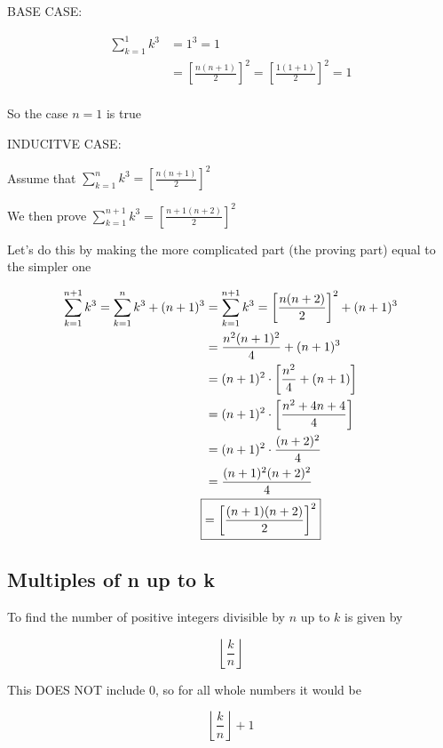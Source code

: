 \documentclass[../../Main.tex]{subfiles}
\begin{document}
\begin{poof}
    BASE CASE:

    \begin{align*}
        \sum_{k = 1}^{1}k^3 &= 1^3 = 1 \\
        &= \left[ \frac{n (n + 1)}{2}\right]^2 = \left[ \frac{1(1 + 1)}{2}\right]^2 = 1 \\
    \end{align*}

    So the case $n = 1$ is true

    INDUCITVE CASE:

    Assume that $\sum_{k = 1}^{n}k^3 = \left[ \frac{n (n + 1)}{2}\right]^2$

    We then prove $\sum_{k = 1}^{n + 1}k^3 = \left[ \frac{n + 1 (n + 2)}{2}\right]^2$

    Let's do this by making the more complicated part (the proving part) equal to the simpler one

    \begin{align*}
        \sum_{k = 1}^{n + 1}k^3 = \sum_{k = 1}^{n}k^3 + (n + 1)^3 &= 
        \sum_{k = 1}^{n + 1}k^3 = \left[ \frac{n(n + 2)}{2}\right]^2 + (n + 1)^3 \\
        &= \frac{n^2(n + 1)^2}{4} + (n + 1)^3 \\
        &= (n + 1)^2 \cdot \left[ \frac{n^2}{4} + (n + 1)\right] \\
        &= (n + 1)^2 \cdot \left[ \frac{n^2 + 4n + 4}{4} \right] \\
        &= (n + 1)^2 \cdot \frac{(n + 2)^2}{4} \\
        &= \frac{(n + 1)^2(n + 2)^2}{4} \\
        \Aboxed{&= \left[\frac{(n + 1)(n + 2)}{2}\right]^2}
    \end{align*}
\end{poof}

\subsection{Multiples of n up to k}

\begin{theorem}
    To find the number of positive integers divisible by $n$ up to $k$ is given by

    $$\left\lfloor \frac{k}{n} \right\rfloor$$

    This DOES NOT include 0, so for all whole numbers it would be

    $$\left\lfloor \frac{k}{n} \right\rfloor + 1$$
\end{theorem}
\end{document}
